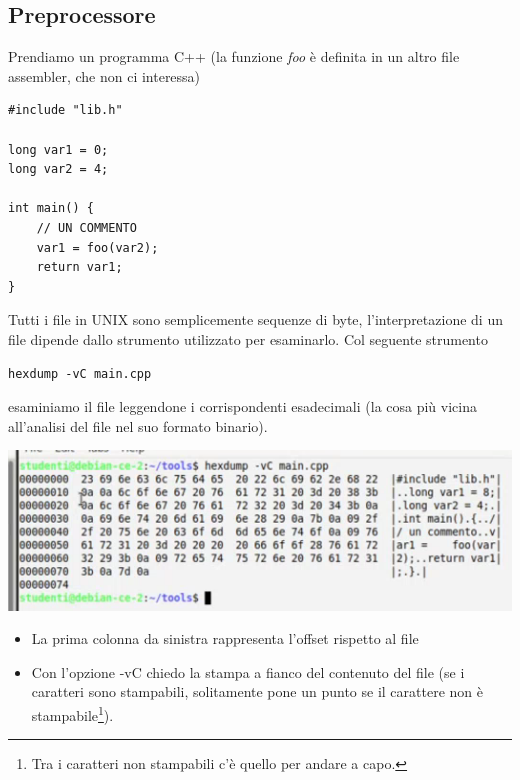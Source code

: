 \documentclass[11pt]{report}
\theoremstyle{definition}
\begin{document}
\subsection{Preprocessore}
Prendiamo un programma C++ (la funzione \emph{foo} è definita in un altro file assembler, che non ci interessa)
\begin{verbatim}
#include "lib.h"

long var1 = 0;
long var2 = 4;

int main() {
    // UN COMMENTO
    var1 = foo(var2);
    return var1;
}
\end{verbatim}
Tutti i file in UNIX sono semplicemente sequenze di byte, l'interpretazione di un file dipende dallo strumento utilizzato per esaminarlo. Col seguente strumento
\begin{verbatim}
hexdump -vC main.cpp
\end{verbatim}
esaminiamo il file leggendone i corrispondenti esadecimali (la cosa più vicina all'analisi del file nel suo formato binario).\begin{center}
\includegraphics{img/51.PNG}
\end{center}  
\begin{itemize}
\item La prima colonna da sinistra rappresenta l'offset rispetto al file
\item Con l'opzione -vC chiedo la stampa a fianco del contenuto del file (se i caratteri sono stampabili, solitamente pone un punto se il carattere non è stampabile\footnote{Tra i caratteri non stampabili c'è quello per andare a capo.}).
\end{itemize}
\end{document}

